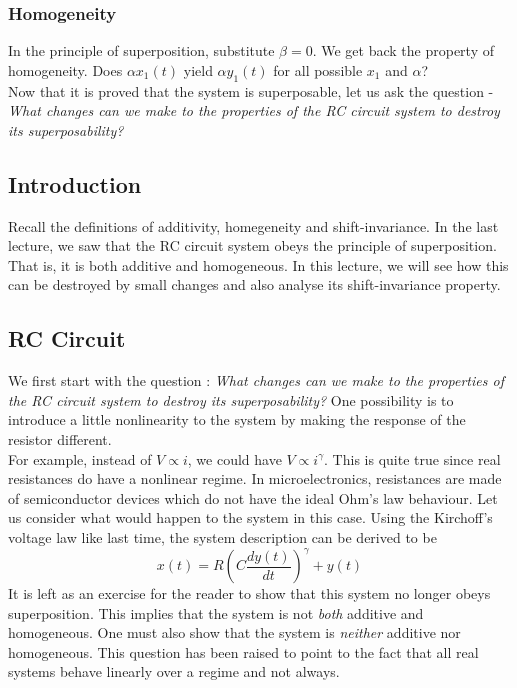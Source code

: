 \subsubsection*{Homogeneity} In the principle of superposition, substitute $\beta = 0$. We get back the property of homogeneity. Does $\alpha x_{1}(t)$ yield $\alpha y_{1}(t)$ for all possible $x_{1}$ and $\alpha$?
\\

Now that it is proved that the system is superposable, let us ask the question - \textit {What changes can we make to the properties of the RC circuit system to destroy its superposability?}

\subsection{Introduction}
Recall the definitions of additivity, homegeneity and shift-invariance. In the last lecture, we saw that the RC circuit system obeys the principle of superposition. That is, it is both additive and homogeneous. In this lecture, we will see how this can be destroyed by small changes and also analyse its shift-invariance property. 

\subsection{RC Circuit}
We first start with the question : \textit {What changes can we make to the properties of the RC circuit system to destroy its superposability?} One possibility is to introduce a little nonlinearity to the system by making the response of the resistor different.
\\

For example, instead of $V \propto i$, we could have $V \propto i^{\gamma}$. This is quite true since real resistances do have a nonlinear regime. In microelectronics, resistances are made of semiconductor devices which do not have the ideal Ohm's law behaviour. Let us consider what would happen to the system in this case. Using the Kirchoff's voltage law like last time, the system description can be derived to be 
\begin{equation}
x(t) = R({C\frac{dy(t)}{dt}})^{\gamma} + y(t) \nonumber
\end{equation}
It is left as an exercise for the reader to show that this system no longer obeys superposition. This implies that the system is not \textit{both} additive and homogeneous. One must also show that the system is \textit{neither} additive nor homogeneous. 
This question has been raised to point to the fact that all real systems behave linearly over a regime and not always. 
\\

